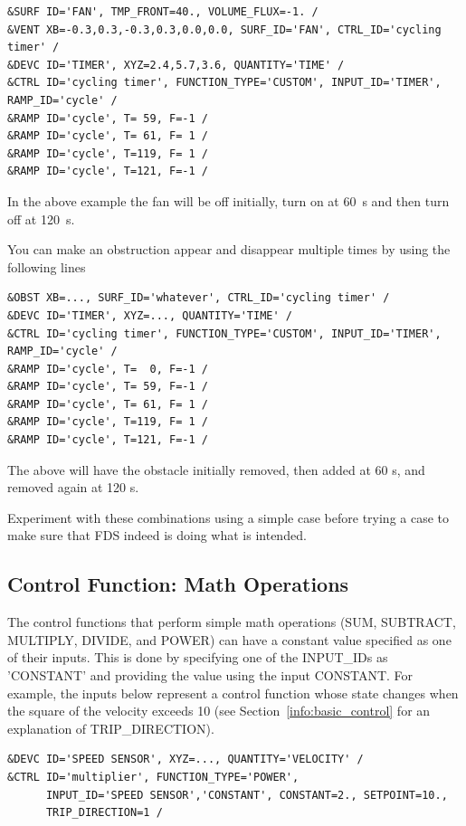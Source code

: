 \documentclass[11pt]{book}
\begin{document}
\begin{lstlisting}
&SURF ID='FAN', TMP_FRONT=40., VOLUME_FLUX=-1. /
&VENT XB=-0.3,0.3,-0.3,0.3,0.0,0.0, SURF_ID='FAN', CTRL_ID='cycling timer' /
&DEVC ID='TIMER', XYZ=2.4,5.7,3.6, QUANTITY='TIME' /
&CTRL ID='cycling timer', FUNCTION_TYPE='CUSTOM', INPUT_ID='TIMER', RAMP_ID='cycle' /
&RAMP ID='cycle', T= 59, F=-1 /
&RAMP ID='cycle', T= 61, F= 1 /
&RAMP ID='cycle', T=119, F= 1 /
&RAMP ID='cycle', T=121, F=-1 /
\end{lstlisting}

\noindent
In the above example the fan will be off initially, turn on at 60~s and then turn off at 120~s.

You can make an obstruction appear and disappear multiple times by using the following lines

\begin{lstlisting}
&OBST XB=..., SURF_ID='whatever', CTRL_ID='cycling timer' /
&DEVC ID='TIMER', XYZ=..., QUANTITY='TIME' /
&CTRL ID='cycling timer', FUNCTION_TYPE='CUSTOM', INPUT_ID='TIMER', RAMP_ID='cycle' /
&RAMP ID='cycle', T=  0, F=-1 /
&RAMP ID='cycle', T= 59, F=-1 /
&RAMP ID='cycle', T= 61, F= 1 /
&RAMP ID='cycle', T=119, F= 1 /
&RAMP ID='cycle', T=121, F=-1 /
\end{lstlisting}

\noindent
The above will have the obstacle initially removed, then added at 60 s, and removed again at 120 s.

Experiment with these combinations using a simple
case before trying a case to make sure that FDS indeed is doing what is intended.

\subsection{Control Function: Math Operations }
\label{info:CONTROL_MATH}

The control functions that perform simple math operations ({\ct SUM},  {\ct SUBTRACT},  {\ct MULTIPLY},  {\ct DIVIDE}, and  {\ct POWER}) can have a constant value specified as one of their inputs.  This is done by specifying one of the {\ct INPUT\_ID}s as {\ct 'CONSTANT'} and providing the value using the input {\ct CONSTANT}. For example, the inputs below represent a control function whose state changes when the square of the velocity exceeds 10 (see Section~\ref{info:basic_control} for an explanation of {\ct TRIP\_DIRECTION}).

\begin{lstlisting}
&DEVC ID='SPEED SENSOR', XYZ=..., QUANTITY='VELOCITY' /
&CTRL ID='multiplier', FUNCTION_TYPE='POWER',
      INPUT_ID='SPEED SENSOR','CONSTANT', CONSTANT=2., SETPOINT=10.,
      TRIP_DIRECTION=1 /
\end{lstlisting}
\end{document}
